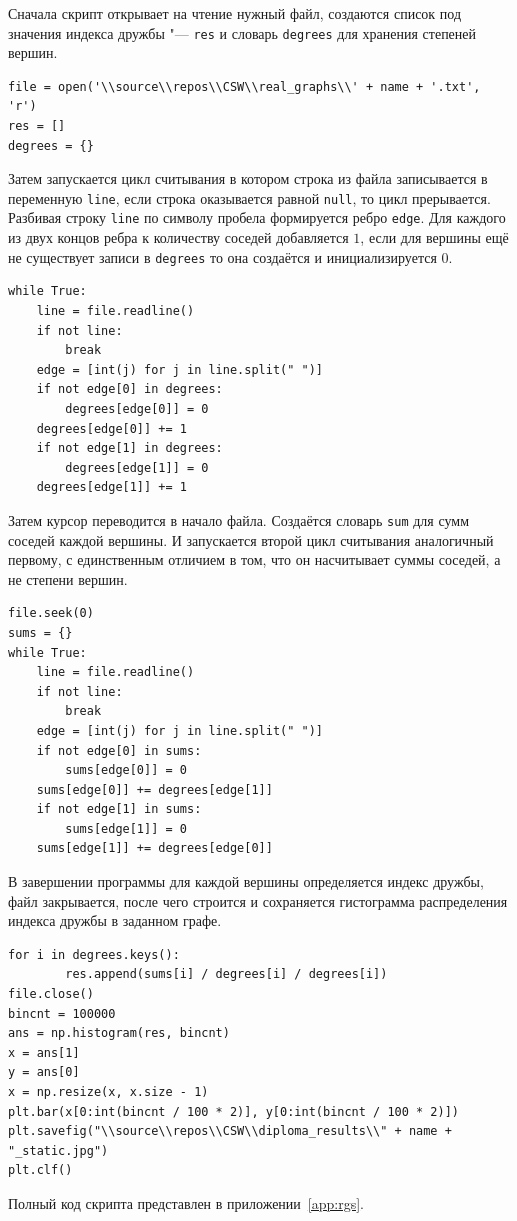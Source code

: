 \documentclass[bachelor, och, diploma]{SCWorks}
\begin{document}
Сначала скрипт открывает на чтение нужный файл, создаются список под значения индекса дружбы "--- \texttt{res} и словарь \texttt{degrees} для хранения степеней вершин.
\begin{verbatim}
file = open('\\source\\repos\\CSW\\real_graphs\\' + name + '.txt', 'r')
res = []
degrees = {}
\end{verbatim}
Затем запускается цикл считывания в котором строка из файла записывается в переменную \texttt{line}, если строка оказывается равной \texttt{null}, то цикл прерывается. Разбивая строку \texttt{line} по символу пробела формируется ребро \texttt{edge}. Для каждого из двух концов ребра к количеству соседей добавляется $1$, если для вершины ещё не существует записи в \texttt{degrees} то она создаётся и инициализируется $0$.
\begin{verbatim}
while True:
    line = file.readline()
    if not line:
        break
    edge = [int(j) for j in line.split(" ")]
    if not edge[0] in degrees:
        degrees[edge[0]] = 0
    degrees[edge[0]] += 1
    if not edge[1] in degrees:
        degrees[edge[1]] = 0
    degrees[edge[1]] += 1
\end{verbatim}
Затем курсор переводится в начало файла. Создаётся словарь \texttt{sum} для сумм соседей каждой вершины. И запускается второй цикл считывания аналогичный первому, с единственным отличием в том, что он насчитывает суммы соседей, а не степени вершин.
\begin{verbatim}
file.seek(0)
sums = {}
while True:
    line = file.readline()
    if not line:
        break
    edge = [int(j) for j in line.split(" ")]
    if not edge[0] in sums:
        sums[edge[0]] = 0
    sums[edge[0]] += degrees[edge[1]]
    if not edge[1] in sums:
        sums[edge[1]] = 0
    sums[edge[1]] += degrees[edge[0]]
\end{verbatim}
В завершении программы для каждой вершины определяется индекс дружбы, файл закрывается, после чего строится и сохраняется гистограмма распределения индекса дружбы в заданном графе. 
\begin{verbatim}
for i in degrees.keys():
        res.append(sums[i] / degrees[i] / degrees[i])
file.close()
bincnt = 100000
ans = np.histogram(res, bincnt)
x = ans[1]
y = ans[0]
x = np.resize(x, x.size - 1)
plt.bar(x[0:int(bincnt / 100 * 2)], y[0:int(bincnt / 100 * 2)])
plt.savefig("\\source\\repos\\CSW\\diploma_results\\" + name + "_static.jpg")
plt.clf()
\end{verbatim}
Полный код скрипта представлен в приложении~\ref{app:rgs}.
\end{document}

